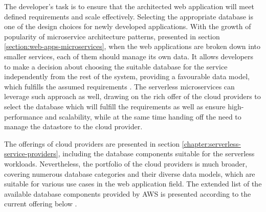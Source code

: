 The developer's task is to ensure that the architected web application will meet defined requirements and scale effectively.
Selecting the appropriate database is one of the design choices for newly developed applications.
With the growth of popularity of microservice architecture patterns, presented in section \ref{section:web-apps-microservices}, when the web applications are broken down into smaller services, each of them should manage its own data.
It allows developers to make a decision about choosing the suitable database for the service independently from the rest of the system, providing a favourable data model, which fulfills the assumed requirements \cite{AOneSizeFitsAllDatabaseDoesntFitAnyone}.
The serverless microservices can leverage such approach as well, drawing on the rich offer of the cloud providers to select the database which will fulfill the requirements as well as ensure high-performance and scalability, while at the same time handing off the need to manage the datastore to the cloud provider.

The offerings of cloud providers are presented in section \ref{chapter:serverless-service-providers}, including the database components suitable for the serverless workloads.
Nevertheless, the portfolio of the cloud providers is much broader, covering numerous database categories and their diverse data models, which are suitable for various use cases in the web application field.
The extended list of the available database components provided by AWS is presented according to the current offering below \cite{DatabasesOnAWS}.

